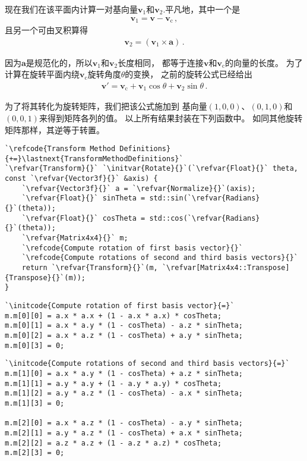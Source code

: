 现在我们在该平面内计算一对基向量$\bm v_1$和$\bm v_2$.平凡地，其中一个是
\begin{align*}
    \bm v_1=\bm v-\bm v_\mathrm{c}\, ,
\end{align*}
且另一个可由叉积算得
\begin{align*}
    \bm v_2=(\bm v_1\times\bm a)\, .
\end{align*}

因为$\bm a$是规范化的，所以$\bm v_1$和$\bm v_2$长度相同，
都等于连接$\bm v$和$\bm v_\mathrm{c}$的向量的长度。
为了计算在旋转平面内绕$\bm v_\mathrm{c}$旋转角度$\theta$的变换，
之前的旋转公式已经给出
\begin{align*}
    \bm v'=\bm v_\mathrm{c}+\bm v_1\cos\theta+\bm v_2\sin\theta\, .
\end{align*}

为了将其转化为旋转矩阵，我们把该公式施加到
基向量$(1,0,0)$、$(0,1,0)$和$(0,0,1)$来得到矩阵各列的值。
以上所有结果封装在下列函数中。
如同其他旋转矩阵那样，其逆等于转置。
\begin{lstlisting}
`\refcode{Transform Method Definitions}{+=}\lastnext{TransformMethodDefinitions}`
`\refvar{Transform}{}` `\initvar{Rotate}{}`(`\refvar{Float}{}` theta, const `\refvar{Vector3f}{}` &axis) {
    `\refvar{Vector3f}{}` a = `\refvar{Normalize}{}`(axis);
    `\refvar{Float}{}` sinTheta = std::sin(`\refvar{Radians}{}`(theta));
    `\refvar{Float}{}` cosTheta = std::cos(`\refvar{Radians}{}`(theta));
    `\refvar{Matrix4x4}{}` m;
    `\refcode{Compute rotation of first basis vector}{}`
    `\refcode{Compute rotations of second and third basis vectors}{}`
    return `\refvar{Transform}{}`(m, `\refvar[Matrix4x4::Transpose]{Transpose}{}`(m));
}
\end{lstlisting}

\begin{lstlisting}
`\initcode{Compute rotation of first basis vector}{=}`
m.m[0][0] = a.x * a.x + (1 - a.x * a.x) * cosTheta;
m.m[0][1] = a.x * a.y * (1 - cosTheta) - a.z * sinTheta;
m.m[0][2] = a.x * a.z * (1 - cosTheta) + a.y * sinTheta;
m.m[0][3] = 0;
\end{lstlisting}

\begin{lstlisting}
`\initcode{Compute rotations of second and third basis vectors}{=}`
m.m[1][0] = a.x * a.y * (1 - cosTheta) + a.z * sinTheta;
m.m[1][1] = a.y * a.y + (1 - a.y * a.y) * cosTheta;
m.m[1][2] = a.y * a.z * (1 - cosTheta) - a.x * sinTheta;
m.m[1][3] = 0;

m.m[2][0] = a.x * a.z * (1 - cosTheta) - a.y * sinTheta;
m.m[2][1] = a.y * a.z * (1 - cosTheta) + a.x * sinTheta;
m.m[2][2] = a.z * a.z + (1 - a.z * a.z) * cosTheta;
m.m[2][3] = 0;
\end{lstlisting}

